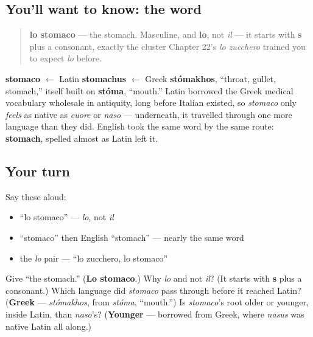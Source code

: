 \subsection*{You'll want to know: the word}
\begin{quote}
\textbf{lo stomaco} — the stomach. Masculine, and \textbf{lo}, not \emph{il} — it starts with \textbf{s} plus a consonant, exactly the cluster Chapter 22's \emph{lo zucchero} trained you to expect \emph{lo} before.
\end{quote}

\begin{cousinweb}
\textbf{stomaco} $\leftarrow$ Latin \textbf{stomachus} $\leftarrow$ Greek \textbf{stómakhos}, \textquotedblleft{}throat, gullet, stomach,\textquotedblright{} itself built on \textbf{stóma}, \textquotedblleft{}mouth.\textquotedblright{} Latin borrowed the Greek medical vocabulary wholesale in antiquity, long before Italian existed, so \emph{stomaco} only \emph{feels} as native as \emph{cuore} or \emph{naso} — underneath, it travelled through one more language than they did. English took the same word by the same route: \textbf{stomach}, spelled almost as Latin left it.
\end{cousinweb}

\subsection*{Your turn}
Say these aloud:

\begin{itemize}
\raggedright
  \item \textquotedblleft{}lo stomaco\textquotedblright{} — \emph{lo}, not \emph{il}
  \item \textquotedblleft{}stomaco\textquotedblright{} then English \textquotedblleft{}stomach\textquotedblright{} — nearly the same word
  \item the \emph{lo} pair — \textquotedblleft{}lo zucchero, lo stomaco\textquotedblright{}
\end{itemize}

\begin{tcolorbox}[breakable,colback=teal!4,colframe=teal!35!black,title={Before you move on}]
Give \textquotedblleft{}the stomach.\textquotedblright{} (\textbf{Lo stomaco}.) Why \emph{lo} and not \emph{il}? (It starts with \textbf{s} plus a consonant.) Which language did \emph{stomaco} pass through before it reached Latin? (\textbf{Greek} — \emph{stómakhos}, from \emph{stóma}, \textquotedblleft{}mouth.\textquotedblright{}) Is \emph{stomaco}'s root older or younger, inside Latin, than \emph{naso}'s? (\textbf{Younger} — borrowed from Greek, where \emph{nasus} was native Latin all along.)
\end{tcolorbox}
